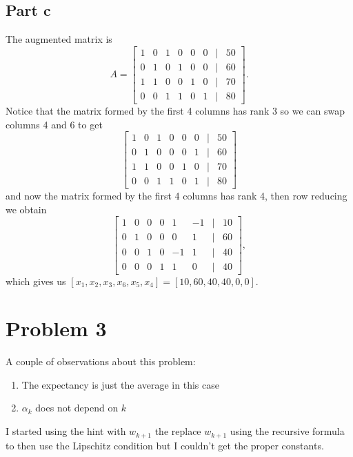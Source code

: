 \documentclass{article}
\begin{document}
\subsection*{Part c}
The augmented matrix is
\[
A=\begin{bmatrix}
1 & 0 & 1 & 0 & 0 & 0 & | & 50\\
0 & 1 & 0 & 1 & 0 & 0 & | & 60\\
1 & 1 & 0 & 0 & 1 & 0 & | & 70\\
0 & 0 & 1 & 1 & 0 & 1 & | & 80
\end{bmatrix}.
\]
Notice that the matrix formed by the first 4 columns has rank 3 so we can swap
columns 4 and 6 to get
\[
\begin{bmatrix}
1 & 0 & 1 & 0 & 0 & 0 & | & 50\\
0 & 1 & 0 & 0 & 0 & 1 & | & 60\\
1 & 1 & 0 & 0 & 1 & 0 & | & 70\\
0 & 0 & 1 & 1 & 0 & 1 & | & 80
\end{bmatrix}
\]
and now the matrix formed by the first 4 columns has rank 4, then row reducing
we obtain
\[
\begin{bmatrix}
1 & 0 & 0 & 0 &  1 & -1 & | & 10\\
0 & 1 & 0 & 0 &  0 &  1 & | & 60\\
0 & 0 & 1 & 0 & -1 &  1 & | & 40\\
0 & 0 & 0 & 1 &  1 &  0 & | & 40
\end{bmatrix},
\]
which gives us $[x_1,x_2,x_3,x_6,x_5,x_4]=[10,60,40,40,0,0]$.
\section*{Problem 3}
A couple of observations about this problem:
\begin{enumerate}
\item The expectancy is just the average in this case
\item $\alpha_k$ does not depend on $k$
\end{enumerate}

I started using the hint with $w_{k+1}$ the replace $w_{k+1}$ using the
recursive formula to then use the Lipschitz condition but I couldn't get the
proper constants.
\end{document}
